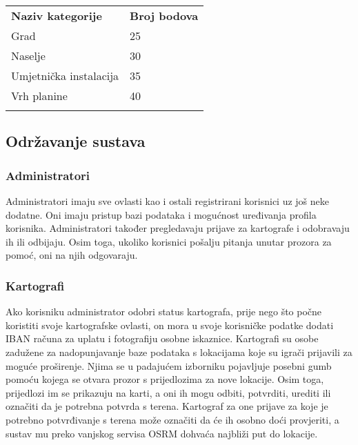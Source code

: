 		
		\begin{tabular}{ll}
			\textbf{Naziv kategorije} & \textbf{Broj bodova} \\
			Grad                      & 25                   \\
			Naselje                   & 30                   \\
			Umjetnička instalacija    & 35                   \\
			Vrh planine               & 40                   \\
				&                     
		\end{tabular}
	
		\newpage
		
		\subsection{Održavanje sustava}
		 
		\subsubsection{Administratori}
		
		{Administratori imaju sve ovlasti kao i ostali registrirani korisnici uz još neke dodatne. Oni imaju pristup bazi podataka i mogućnost uređivanja profila korisnika. Administratori također pregledavaju prijave za kartografe i odobravaju ih ili odbijaju. Osim toga, ukoliko korisnici pošalju pitanja unutar prozora za pomoć, oni na njih odgovaraju.}
		
		\subsubsection{Kartografi}
		
		{Ako korisniku administrator odobri status kartografa, prije nego što počne koristiti svoje kartografske ovlasti, on mora u svoje korisničke podatke dodati IBAN računa za uplatu i fotografiju osobne iskaznice. Kartografi su osobe zadužene za nadopunjavanje baze podataka s lokacijama koje su igrači prijavili za moguće proširenje. Njima se u padajućem izborniku pojavljuje posebni gumb pomoću kojega se otvara prozor s prijedlozima za nove lokacije. Osim toga, prijedlozi im se prikazuju na karti, a oni ih mogu odbiti, potvrditi, urediti ili označiti da je potrebna potvrda s terena. Kartograf za one prijave za koje je potrebno potvrđivanje s terena može označiti da će ih osobno doći provjeriti, a sustav mu preko vanjskog servisa OSRM dohvaća najbliži put do lokacije.} 
		
